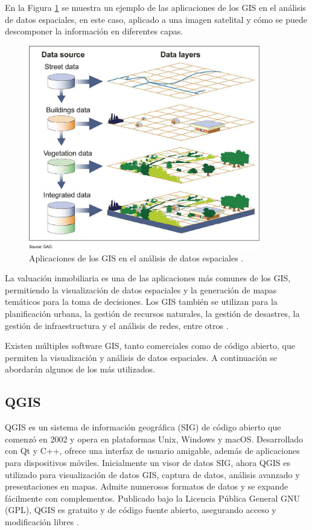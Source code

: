 En la Figura \ref{fig:gis-analysis} se muestra un ejemplo de las aplicaciones de
los GIS en el análisis de datos espaciales, en este caso, aplicado a una imagen
satelital y cómo se puede descomponer la información en diferentes capas.

\begin{figure}[!htbp]
  \centering
  \includegraphics[width=0.9\textwidth]{imagenes/02-marco-teorico/gis-analysis.jpg}
  \caption[Aplicaciones de los GIS en el análisis de datos espaciales]{Aplicaciones de los GIS en el análisis de datos espaciales \cite{national_geographic_gis_2023}.}
  \label{fig:gis-analysis}
\end{figure}

La valuación inmobiliaria es una de las aplicaciones más comunes de los GIS,
permitiendo la visualización de datos espaciales y la generación de mapas temáticos
para la toma de decisiones. Los GIS también se utilizan para la planificación urbana,
la gestión de recursos naturales, la gestión de desastres, la gestión de infraestructura
y el análisis de redes, entre otros \cite{wyatt1997development}.

Existen múltiples software GIS, tanto comerciales como de código abierto, que
permiten la visualización y análisis de datos espaciales. A continuación se
abordarán algunos de los más utilizados.

\subsection{QGIS}
QGIS es un sistema de información geográfica (SIG) de código abierto que comenzó
en 2002 y opera en plataformas Unix, Windows y macOS. Desarrollado con Qt y C++,
ofrece una interfaz de usuario amigable, además de aplicaciones para dispositivos
móviles. Inicialmente un visor de datos SIG, ahora QGIS es utilizado para
visualización de datos GIS, captura de datos, análisis avanzado y presentaciones
en mapas. Admite numerosos formatos de datos y se expande fácilmente con complementos.
Publicado bajo la Licencia Pública General GNU (GPL), QGIS es gratuito y de código
fuente abierto, asegurando acceso y modificación libres \cite{qgis_3.28_user_guide}.

